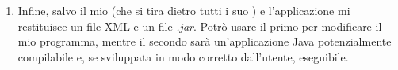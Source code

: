 \begin{enumerate}
	\item Infine, salvo il mio  (che si tira dietro tutti i suo ) e l'applicazione mi restituisce un file XML e un file \emph{.jar}. Potrò usare il primo per modificare il mio programma, mentre il secondo sarà un'applicazione Java potenzialmente compilabile e, se sviluppata in modo corretto dall'utente, eseguibile.
\end{enumerate}

